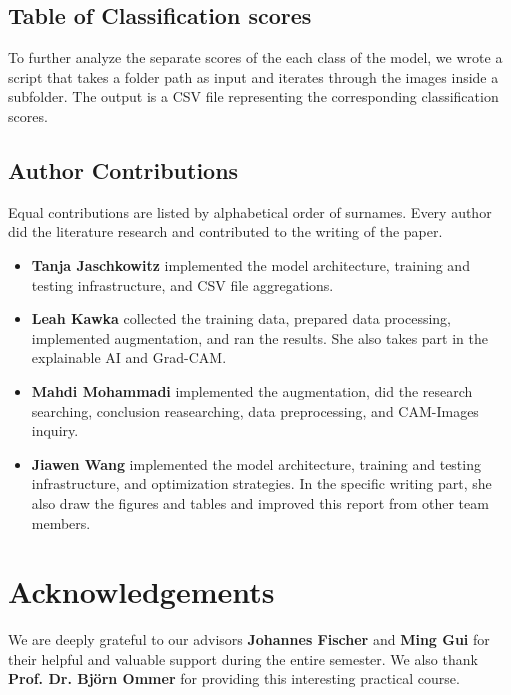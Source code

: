 \subsection{Table of Classification scores}
\label{sec:optim:csv}
To further analyze the separate scores of the each class of the model, 
we wrote a script that takes a folder path as input and iterates through the images inside a subfolder. 
The output is a CSV file representing the corresponding classification scores. 

\subsection*{Author Contributions}
\label{sec:author}
Equal contributions are listed by alphabetical order of surnames. 
Every author did the literature research and contributed to the writing of the paper. 

\begin{itemize}
  \item \textbf{Tanja Jaschkowitz} implemented the model architecture, training and testing infrastructure, and CSV file aggregations. 
  \item \textbf{Leah Kawka} collected the training data, prepared data processing, implemented augmentation, and ran the results. 
  She also takes part in the explainable AI and Grad-CAM.
  \item \textbf{Mahdi Mohammadi} implemented the augmentation, did the research searching, conclusion reasearching, data preprocessing, and CAM-Images inquiry.
  \item \textbf{Jiawen Wang} implemented the model architecture, training and testing infrastructure, and optimization strategies. 
  In the specific writing part, she also draw the figures and tables and improved this report from other team members.
\end{itemize}

\section*{Acknowledgements}

We are deeply grateful to our advisors \textbf{Johannes Fischer} and \textbf{Ming Gui} for their helpful and valuable support during the entire semester. 
We also thank \textbf{Prof. Dr. Björn Ommer} for providing this interesting practical course.
